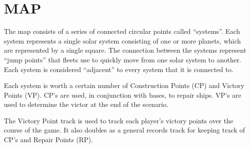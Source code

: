 \section{MAP}
The map consists of a series of connected circular points called “systems”. Each system represents a single solar system consisting of one or more planets, which are represented by a single square. The connection between the systems represent “jump points” that fleets use to quickly move from one solar system to another. Each system is considered “adjacent” to every system that it is connected to.

Each system is worth a certain number of Construction Points (CP) and Victory Points (VP). CP’s are used, in conjunction with bases, to repair ships. VP’s are used to determine the victor at the end of the scenario.

The Victory Point track is used to track each player’s victory points over the course of the game. It also doubles as a general records track for keeping track of CP’s and Repair Points (RP).